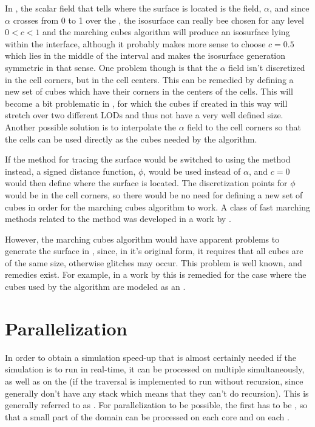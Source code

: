 In \thisprojectwork, the scalar field that tells where the surface is located is the  {field}, $\alpha$, and since $\alpha$ crosses from 0 to 1 over the \interface, the isosurface can really bee chosen for any level $0 < c < 1$ and the marching cubes algorithm will produce an isosurface lying within the interface, although it probably makes more sense to choose $c = 0.5$ which lies in the middle of the interval and makes the isosurface generation symmetric in that sense. One problem though is that the $\alpha$ field isn't discretized in the cell corners, but in the cell centers. This can be remedied by defining a new set of cubes which have their corners in the centers of the cells. This will become a bit problematic in , for which the cubes if created in this way will stretch over two different LODs and thus not have a very well defined size. Another possible solution is to interpolate the $\alpha$ field to the cell corners so that the cells can be used directly as the cubes needed by the algorithm.

If the \VOF method for tracing the surface would be switched to using the \LS method instead, a signed distance function, $\phi$, would be used instead of $\alpha$, and $c = 0$ would then define where the surface is located. The discretization points for $\phi$ would be in the cell corners, so there would be no need for defining a new set of cubes in order for the marching cubes algorithm to work. A class of fast marching methods related to the \LS method was developed in a work by \citet{Sethian1995}.

However, the marching cubes algorithm would have apparent problems to generate the surface in , since, in it's original form, it requires that all cubes are of the same size, otherwise glitches may occur. This problem is well known, and remedies exist. For example, in a work by \citet{Lengyel2010} this is remedied for the case where the cubes used by the algorithm are modeled as an \octree.

\section{Parallelization}

In order to obtain a simulation speed-up that is almost certainly needed if the simulation is to run in real-time, it can be processed on multiple \CPUs simultaneously, as well as on the \GPU (if the \octree traversal is implemented to run without recursion, since \GPUs generally don't have any stack which means that they can't do recursion). This is generally referred to as \parallelization. For parallelization to be possible, the  first has to be \partitioned, so that a small part of the domain can be processed on each core and on each .

